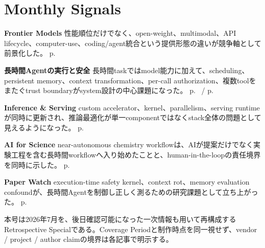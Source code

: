 \section*{Monthly Signals}
\smallskip
\noindent \textbf{Frontier Models} 性能順位だけでなく、open-weight、multimodal、API lifecycle、computer-use、coding/agent統合という提供形態の違いが競争軸として前景化した。 \hfill{\footnotesize p.~\pageref{pkg:frontier-models-june}}
\par
\smallskip
\noindent \textbf{長時間Agentの実行と安全} 長時間taskではmodel能力に加えて、scheduling、persistent memory、context transformation、per-call authorization、複数toolをまたぐtrust boundaryがsystem設計の中心課題になった。 \hfill{\footnotesize p.~\pageref{pkg:agents-memory-june} / p.~\pageref{pkg:agent-safety-security-june}}
\par
\smallskip
\noindent \textbf{Inference \& Serving} custom accelerator、kernel、parallelism、serving runtimeが同時に更新され、推論最適化が単一componentではなくstack全体の問題として見えるようになった。 \hfill{\footnotesize p.~\pageref{pkg:inference-serving-june}}
\par
\smallskip
\noindent \textbf{AI for Science} near-autonomous chemistry workflowは、AIが提案だけでなく実験工程を含む長時間workflowへ入り始めたことと、human-in-the-loopの責任境界を同時に示した。 \hfill{\footnotesize p.~\pageref{pkg:ai-for-science-june}}
\par
\smallskip
\noindent \textbf{Paper Watch} execution-time safety kernel、context rot、memory evaluation confoundが、長時間Agentを制御し正しく測るための研究課題として立ち上がった。 \hfill{\footnotesize p.~\pageref{pkg:paper-watch-june}}
\par
\medskip
\begin{claimboundary}
本号は2026年7月を、後日確認可能になった一次情報も用いて再構成するRetrospective Specialである。Coverage Periodと制作時点を同一視せず、vendor / project / author claimの境界は各記事で明示する。
\end{claimboundary}
\medskip
\tableofcontents
